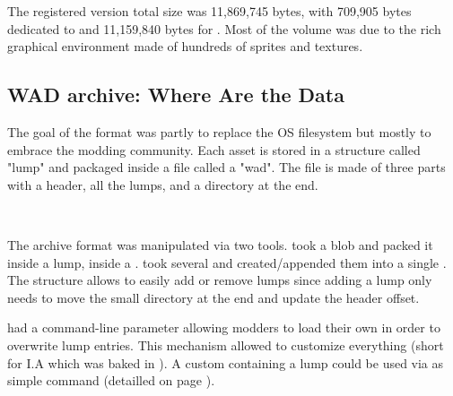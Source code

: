 %   
\vspace{2mm}
\pagebreak
The registered version total size was 11,869,745 bytes, with 709,905 bytes dedicated to  and 11,159,840 bytes for . Most of the volume was due to the rich graphical environment made of hundreds of sprites and textures.\\
\par


\par
{}
%  




\subsection{WAD archive: Where Are the Data}
\label{wad_explained}
The goal of the  format was partly to replace the OS filesystem but mostly to embrace the modding community. Each asset is stored in a structure called "lump" and packaged inside a file called a "wad". The file is made of three parts with a header, all the lumps, and a directory at the end.\\

\par
{}
\par
{}\\
\par
{}
\par
The archive format was manipulated via two tools.  took a blob and packed it inside a lump, inside a .  took several  and created/appended them into a single . The structure allows to easily add or remove lumps since adding a lump only needs to move the small directory at the end and update the header offset.\\
\par
\doom{}had a command-line parameter allowing modders to load their own  in order to overwrite  lump entries. This mechanism allowed to customize everything (short for I.A which was baked in ). A custom  containing a  lump could be used via as simple  command (detailled on page \pageref{wad_detailled}).





